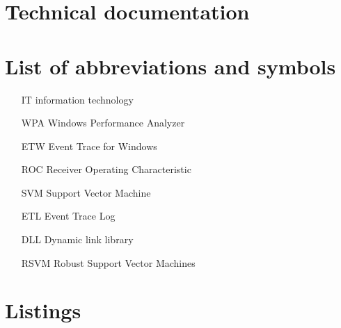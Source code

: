 \documentclass[a4paper,twoside,12pt]{book}
\begin{document}
\begin{appendices} 


\chapter*{Technical documentation}

\chapter*{List of abbreviations and symbols}

\begin{itemize}
\item[IT] information technology
\item[WPA] Windows Performance Analyzer 
\item[ETW] Event Trace for Windows 
\item[ROC] Receiver Operating Characteristic
\item[SVM] Support Vector Machine 
\item[ETL] Event Trace Log 
\item[DLL] Dynamic link library
\item[RSVM] Robust Support Vector Machines 
\end{itemize}

\chapter*{Listings}


\end{appendices}
\end{document}

